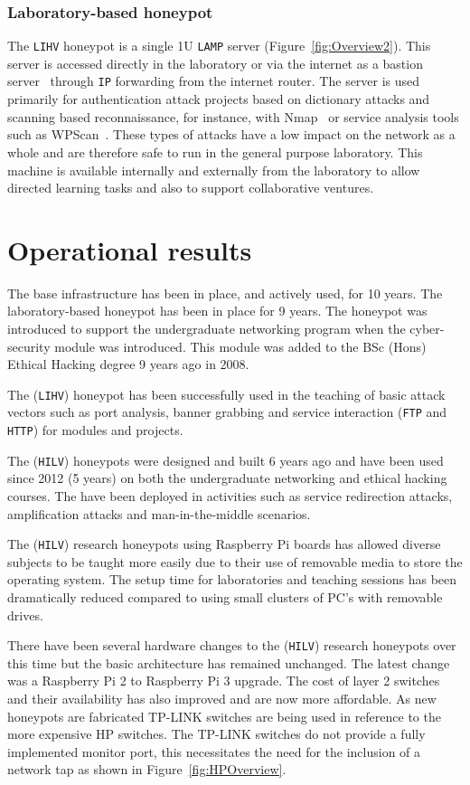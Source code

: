 \subsubsection{Laboratory-based honeypot}
The \texttt{LIHV} honeypot is a single 1U \texttt{LAMP} server (Figure~\ref{fig:Overview2}). This server is accessed directly in the laboratory or via the internet as a bastion server~\cite{MB:05} through \texttt{IP} forwarding from the internet router. The server is used primarily for authentication attack projects based on dictionary attacks and scanning based reconnaissance, for instance, with Nmap~\cite{GFL:09} or service analysis tools such as WPScan~\cite{WT:17}. These types of attacks have a low impact on the network as a whole and are therefore safe to run in the general purpose laboratory. This machine is available internally and externally from the laboratory to allow directed learning tasks and also to support collaborative ventures.

\section{Operational results}\label{Results}
The base infrastructure has been in place, and actively used, for 10 years. The laboratory-based honeypot has been in place for 9 years. The honeypot was introduced to support the undergraduate networking program when the cyber-security module was introduced. This module was added to the BSc (Hons) Ethical Hacking degree 9 years ago in 2008.

The (\texttt{LIHV}) honeypot has been successfully used in the teaching of basic attack vectors such as port analysis, banner grabbing and service interaction (\texttt{FTP} and \texttt{HTTP}) for modules and projects. 

The (\texttt{HILV}) honeypots were designed and built 6 years ago and have been used since 2012 (5 years) on both the undergraduate networking and ethical hacking courses. The have been deployed in activities such as service redirection attacks, amplification attacks and man-in-the-middle scenarios.

The (\texttt{HILV}) research honeypots using Raspberry Pi boards has allowed diverse subjects to be taught more easily due to their use of removable media to store the operating system. The setup time for laboratories and teaching sessions has been dramatically reduced compared to using small clusters of PC's with removable drives. 

There have been several hardware changes to the (\texttt{HILV}) research honeypots over this time but the basic architecture has remained unchanged. The latest change was a Raspberry Pi 2 to Raspberry Pi 3 upgrade. The cost of layer 2 switches and their availability has also improved and are now more affordable. As new honeypots are fabricated TP-LINK switches are being used in reference to the more expensive HP switches. The TP-LINK switches do not provide a fully implemented monitor port, this necessitates the need for the inclusion of a network tap as shown in Figure~\ref{fig:HPOverview}.

